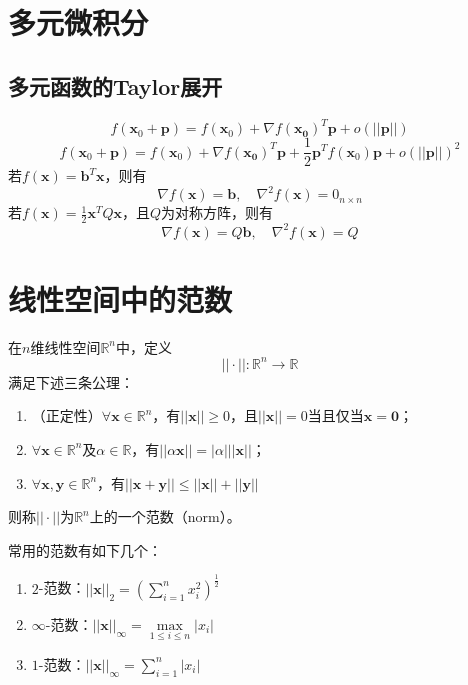 \section{多元微积分}
\subsection{多元函数的Taylor展开}
\begin{equation}
	f(\bm{x}_0+\bm{p}) = f(\bm{x}_0)+\nabla f(\bm{x_0})^T\bm{p} + o(||\bm{p}||)
\end{equation}
\begin{equation}
	f(\bm{x}_0+\bm{p}) = f(\bm{x}_0)+\nabla f(\bm{x_0})^T\bm{p} + \frac{1}{2}\bm{p}^Tf(\bm{x}_0)\bm{p} + o(||\bm{p}||)^2
\end{equation}
若$f(\bm{x}) = \bm{b}^T\bm{x}$，则有
\begin{equation}
	\nabla f(\bm{x}) = \bm{b},\quad \nabla^2 f(\bm{x}) = 0_{n\times n}
\end{equation}
若$f(\bm{x}) = \frac{1}{2}\bm{x}^TQ\bm{x}$，且$Q$为对称方阵，则有
\begin{equation}
	\nabla f(\bm{x}) = Q\bm{b},\quad \nabla^2 f(\bm{x}) = Q
\end{equation}
\section{线性空间中的范数}
\begin{definition}
	在$n$维线性空间$\mathbb{R}^n$中，定义
	\begin{equation*}
			||\cdot||:\mathbb{R}^n \rightarrow \mathbb{R}
	\end{equation*}
	满足下述三条公理：
	\begin{enumerate}
		\item （正定性）$\forall \bm{x}\in \mathbb{R}^n$，有$||\bm{x}||\geq 0$，且$||\bm{x}||= 0$当且仅当$\bm{x} = \bm{0}$；
		\item $\forall \bm{x}\in \mathbb{R}^n$及$\alpha \in \mathbb{R}$，有$||\alpha \bm{x}|| = |\alpha|||\bm{x}||$；
		\item $\forall \bm{x}, \bm{y}\in \mathbb{R}^n$，有$||\bm{x}+\bm{y}||\leq ||\bm{x}||+ ||\bm{y}||$
	\end{enumerate}
	则称$||\cdot||$为$\mathbb{R}^n$上的一个范数（norm）。
\end{definition}
\begin{example}
	常用的范数有如下几个：
	\begin{enumerate}
		\item $2$-范数：$||\bm{x}||_2 = (\sum\limits_{i=1}^n x_i^2)^{\frac{1}{2}}$
		\item $\infty$-范数：$||\bm{x}||_\infty = \max\limits_{1\leq i\leq n}|x_i|$
		\item $1$-范数：$||\bm{x}||_\infty = \sum\limits_{i=1}^n|x_i|$
	\end{enumerate}
\end{example}
